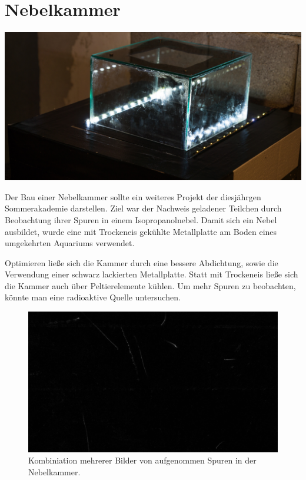 \documentclass[
  captions=tableheading,  %
  titlepage=false, %
  twocolumn,
  headings=small,
]{scrartcl}
\begin{document}
\section*{Nebelkammer}
\begin{center}
  \includegraphics[width=\linewidth]{./images/nebelkammer_aufbau.JPG}
\end{center}
Der Bau einer Nebelkammer sollte ein weiteres Projekt der diesjährgen Sommerakademie darstellen.
Ziel war der Nachweis geladener Teilchen durch Beobachtung ihrer Spuren in einem Isopropanolnebel.
Damit sich ein Nebel ausbildet, wurde eine mit Trockeneis gekühlte Metallplatte am Boden eines umgekehrten Aquariums verwendet.

Optimieren ließe sich die Kammer durch eine bessere Abdichtung, sowie die Verwendung einer schwarz lackierten Metallplatte.
Statt mit Trockeneis ließe sich die Kammer auch über Peltierelemente kühlen.
Um mehr Spuren zu beobachten, könnte man eine radioaktive Quelle untersuchen.
\begin{figure}
  \centering
  \includegraphics[width=\linewidth]{./images/nebelkammer_spuren.png}
  \caption{Kombiniation mehrerer Bilder von aufgenommen Spuren in der Nebelkammer.}
\end{figure}
\end{document}
